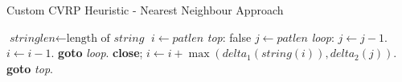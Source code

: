 \documentclass[12pt]{article}
\begin{document}
\begin{algorithm}
	\caption{Custom CVRP Heuristic - Nearest Neighbour Approach}\label{euclid}
	\begin{algorithmic}[1]
	\State $\textit{stringlen} \gets \text{length of }\textit{string}$
	\State $i \gets \textit{patlen}$
	\emph{top}:
	 \Return false
	\EndIf
	\State $j \gets \textit{patlen}$
	\emph{loop}:
	\State $j \gets j-1$.
	\State $i \gets i-1$.
	\State \textbf{goto} \emph{loop}.
	\State \textbf{close};
	\EndIf
	\State $i \gets i+\max(\textit{delta}_1(\textit{string}(i)),\textit{delta}_2(j))$.
	\State \textbf{goto} \emph{top}.
	\EndProcedure
	\end{algorithmic}
	\end{algorithm}


\newpage


\end{document}
